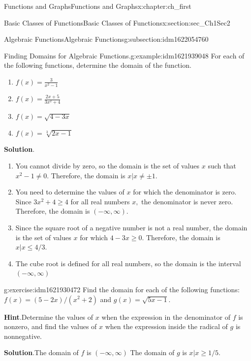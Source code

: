 \documentclass[oneside,10pt,]{book}
\newcommand{\blocktitlefont}{\relax}
\numberwithin{equation}{section}
\begin{document}
\begin{chapterptx}{Functions and Graphs}{}{Functions and Graphs}{}{}{x:chapter:ch_first}
\begin{sectionptx}{Basic Classes of Functions}{}{Basic Classes of Functions}{}{}{x:section:sec_Ch1Sec2}
\begin{subsectionptx}{Algebraic Functions}{}{Algebraic Functions}{}{}{g:subsection:idm1622054760}
\begin{figureptx}
\begin{image}{0.25}{0.5}{0.25}
\end{image}%
\tcblower
\end{figureptx}%
\begin{example}{Finding Domains for Algebraic Functions.}{g:example:idm1621939048}%
For each of the following functions, determine the domain of the function.%
%
\begin{enumerate}
\item{}\(\displaystyle f(x)=\frac{ 3}{ x^2 - 1 }\)%
\item{}\(\displaystyle f(x)=\frac{ 2 x+ 5}{ 3 x^2 + 4 }\)%
\item{}\(\displaystyle f(x)=\sqrt{ 4 - 3 x}\)%
\item{}\(\displaystyle f(x)=\sqrt[3]{2 x- 1}\)%
\end{enumerate}
\par\smallskip%
\noindent\textbf{\blocktitlefont Solution}.\hypertarget{g:solution:idm1621935208}{}\quad{}%
\begin{enumerate}
\item{}You cannot divide by zero, so the domain is the set of values \(x\) such that \(x^2 - 1 \neq  0 .\) Therefore, the domain is \({x|x\neq \pm 1 }.\)%
\item{}You need to determine the values of \(x\) for which the denominator is zero. Since \(3 x^2 + 4 \geq  4 \) for all real numbers \(x,\) the denominator is never zero. Therefore, the domain is \((-\infty,\infty).\)%
\item{}Since the square root of a negative number is not a real number, the domain is the set of values \(x\) for which \(4 - 3 x\geq  0 .\) Therefore, the domain is \({x|x\leq   4  / 3 }.\)%
\item{}The cube root is defined for all real numbers, so the domain is the interval \((-\infty,\infty)\)%
\end{enumerate}
\end{example}
\begin{inlineexercise}{}{g:exercise:idm1621930472}%
Find the domain for each of the following functions: \(f(x)=( 5 - 2 x) /(x^2 + 2 )\) and \(g(x)=\sqrt{ 5 x- 1 }.\)%
\par\smallskip%
\noindent\textbf{\blocktitlefont Hint}.\hypertarget{g:hint:idm1621930600}{}\quad{}Determine the values of \(x\) when the expression in the denominator of \(f\) is nonzero, and find the values of \(x\) when the expression inside the radical of \(g\) is nonnegative.%
\par\smallskip%
\noindent\textbf{\blocktitlefont Solution}.\hypertarget{g:solution:idm1621924840}{}\quad{}The domain of \(f\) is \((-\infty,\infty)\) The domain of \(g\) is \({x|x\geq  1  / 5 }.\)%

\end{inlineexercise}
\end{subsectionptx}
\end{sectionptx}
\end{chapterptx}
\end{document}
